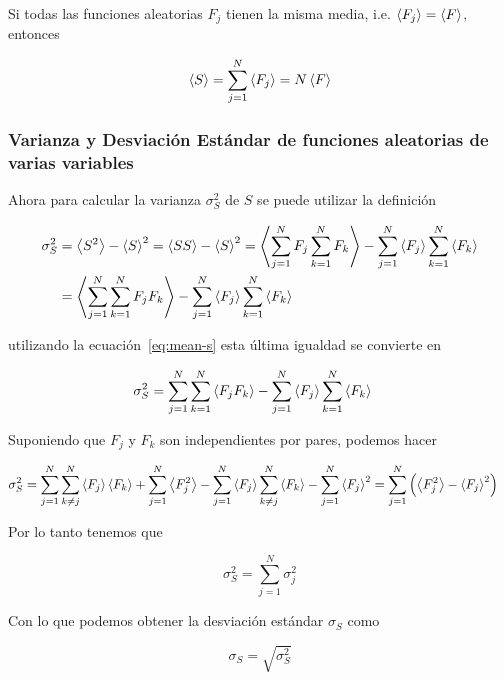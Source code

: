 Si todas las funciones aleatorias $F_j$ tienen la misma media, i.e.
$\left\langle F_j \right\rangle = \left\langle F \right\rangle$, entonces

\begin{equation}
  \left\langle S \right\rangle = \sum_{ j = 1}^N \left\langle F_j \right\rangle= N \left\langle F \right\rangle
  \label{eq:mean-s-eq}
\end{equation}

\subsubsection{Varianza y Desviación Estándar de funciones aleatorias
de varias variables}

Ahora para calcular la varianza $\sigma^2_S$ de $S$ se puede utilizar
la definición

\begin{align*}
  \sigma^2_S &= \left\langle S^2 \right\rangle - \left\langle S \right\rangle^2 = \left\langle SS \right\rangle - \left\langle S \right\rangle^2 = \left\langle 
  \sum_{j=1}^N F_j \sum_{k=1}^N F_k \right\rangle - \sum_{j=1}^N \left\langle F_j \right\rangle
  \sum_{k=1}^N \left\langle F_k \right\rangle
  \\
  &= \left\langle \sum_{j=1}^N \sum_{k=1}^N F_jF_k \right\rangle - \sum_{j=1}^N \left\langle F_j \right\rangle
  \sum_{k=1}^N \left\langle F_k \right\rangle
\end{align*}

utilizando la ecuación~\ref{eq:mean-s} esta última
igualdad se convierte en

\begin{align}
  \sigma^2_S &= \sum_{j=1}^N \sum_{k=1}^N \left\langle F_jF_k \right\rangle - \sum_{j=1}^N
  \left\langle F_j \right\rangle \sum_{k=1}^N \left\langle F_k \right\rangle
\end{align}

Suponiendo que $F_j$ y $F_k$ son independientes por pares, podemos hacer

\begin{align*}
  \sigma^2_S &= \sum_{j=1}^N \sum_{k\neq j}^N \left\langle F_j \right\rangle\left\langle F_k \right\rangle
  + \sum_{j=1}^N \left\langle F_j^2 \right\rangle - \sum_{j=1}^N \left\langle F_j \right\rangle\sum_{k\neq j}^N \left\langle F_k \right\rangle
  - \sum_{j=1}^N \left\langle F_j \right\rangle^2
  = \sum_{j=1}^N \left(
    \left\langle F_j^2 \right\rangle - \left\langle F_j \right\rangle^2
  \right)
\end{align*}

Por lo tanto tenemos que

\begin{equation}
  \sigma^2_S = \sum_{j=1}^N \sigma^2_j
  \label{eq:var-s}
\end{equation}

Con lo que podemos obtener la desviación estándar $\sigma_S$ como

\begin{equation}
  \sigma_S = \sqrt{\sigma^2_S}
  \label{eq:std-s}
\end{equation}

